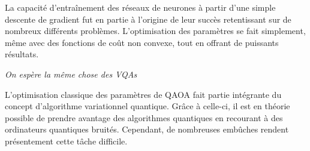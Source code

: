 La capacité d'entraînement des réseaux de neurones à partir d'une simple descente de gradient fut en partie à l'origine de leur succès retentissant sur de nombreux différents problèmes. L'optimisation des paramètres se fait simplement, même avec des fonctions de coût non convexe, tout en offrant de puissants résultats.

\textcolor{mydarkred}{\textit{On espère la même chose des VQAs}}

L'optimisation classique des paramètres de QAOA fait partie intégrante du concept d'algorithme variationnel quantique. Grâce à celle-ci, il est en théorie possible de prendre avantage des algorithmes quantiques en recourant à des ordinateurs quantiques bruités. Cependant, de nombreuses embûches rendent présentement cette tâche difficile. 

